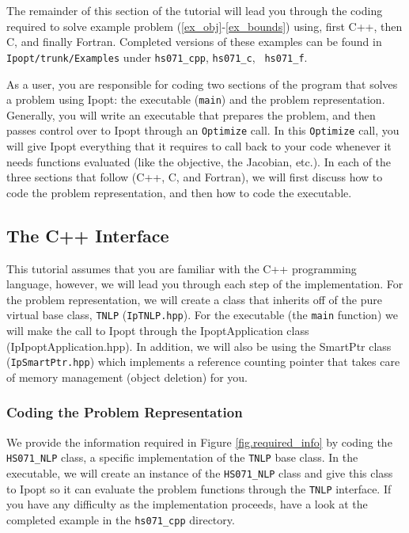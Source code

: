 \documentclass[letter,10pt]{article}
\begin{document}
{%

The remainder of this section of the tutorial will lead you through
the coding required to solve example problem
(\ref{ex_obj}-\ref{ex_bounds}) using, first C++, then C, and finally
Fortran. Completed versions of these examples can be found in {\tt
Ipopt/trunk/Examples} under {\tt hs071\_cpp}, {\tt hs071\_c}, {\tt
hs071\_f}.

As a user, you are responsible for coding two sections of the program
that solves a problem using Ipopt: the executable ({\tt main}) and the
problem representation.  Generally, you will write an executable that
prepares the problem, and then passes control over to Ipopt through an
{\tt Optimize} call. In this {\tt Optimize} call, you will give Ipopt
everything that it requires to call back to your code whenever it
needs functions evaluated (like the objective, the Jacobian, etc.).
In each of the three sections that follow (C++, C, and Fortran), we
will first discuss how to code the problem representation, and then
how to code the executable.

\subsection{The C++ Interface}
This tutorial assumes that you are familiar with the C++ programming
language, however, we will lead you through each step of the
implementation. For the problem representation, we will create a class
that inherits off of the pure virtual base class, {\tt TNLP}
({\tt IpTNLP.hpp}). For the executable (the {\tt main} function) we will
make the call to Ipopt through the IpoptApplication class
(IpIpoptApplication.hpp). In addition, we will also be using the
SmartPtr class ({\tt IpSmartPtr.hpp}) which implements a reference counting
pointer that takes care of memory management (object deletion) for
you.

\subsubsection{Coding the Problem Representation}\label{sec.cpp_problem}
We provide the information required in Figure \ref{fig.required_info}
by coding the {\tt HS071\_NLP} class, a specific implementation of the
{\tt TNLP} base class. In the executable, we will create an instance
of the {\tt HS071\_NLP} class and give this class to Ipopt so it can
evaluate the problem functions through the {\tt TNLP} interface. If
you have any difficulty as the implementation proceeds, have a look at
the completed example in the {\tt hs071\_cpp} directory.

}
\end{document}
